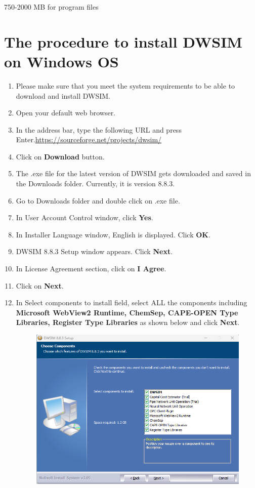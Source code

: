 \documentclass[a4paper,12pt]{article}
\begin{document}
750-2000 MB for program files

\section{The procedure to install DWSIM on Windows OS}

\begin{enumerate}
\item Please make sure that you meet the system requirements to be able to download and install DWSIM.
\item Open your default web browser.
\item In the address bar, type the following URL and press Enter.\newline \url{https://sourceforge.net/projects/dwsim/}
\item Click on \textbf{Download} button.
\item The .exe file for the latest version of DWSIM gets downloaded and saved in the Downloads folder. Currently, it is version 8.8.3.
\item Go to Downloads folder and double click on .exe file.
\item In User Account Control window, click \textbf{Yes}.
\item In Installer Language window, English is displayed. Click \textbf{OK}.
\item DWSIM 8.8.3 Setup window appears. Click \textbf{Next}.
\item In License Agreement section, click on \textbf{I Agree}.
\item Click on \textbf{Next}.
\item In Select components to install field, select ALL the components including \textbf{Microsoft WebView2 Runtime, ChemSep, CAPE-OPEN Type Libraries, Register Type Libraries} as shown below and click \textbf{Next}.
\begin{figure}[H]
	\centering
	\includegraphics[width=0.7\linewidth]{DWSIM-Components.png}

\end{figure}
\end{enumerate}
\end{document}
